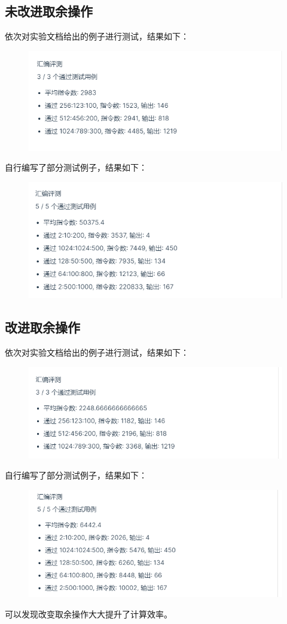\documentclass[12pt, a4paper, oneside]{ctexart}
\begin{document}
\subsection*{未改进取余操作}
依次对实验文档给出的例子进行测试，结果如下：
\begin{figure}[H]
    \centering
    \includegraphics[scale=0.8]{Output1.png}
\end{figure}
自行编写了部分测试例子，结果如下：
\begin{figure}[H]
    \centering
    \includegraphics[scale=0.8]{Output2.png}
\end{figure}

\subsection*{改进取余操作}
依次对实验文档给出的例子进行测试，结果如下：
\begin{figure}[H]
    \centering
    \includegraphics[scale=0.8]{Output4.png}
\end{figure}
自行编写了部分测试例子，结果如下：
\begin{figure}[H]
    \centering
    \includegraphics[scale=0.8]{Output5.png}
\end{figure}
可以发现改变取余操作大大提升了计算效率。
\end{document}
